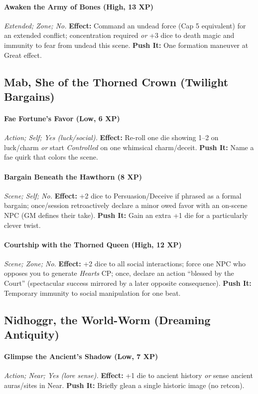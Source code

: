 \documentclass[12pt,twoside]{book}
\begin{document}
\paragraph{Awaken the Army of Bones (High, 13 XP)} \emph{Extended; Zone; No.}
\textbf{Effect:} Command an undead force (Cap 5 equivalent) for an extended conflict; concentration required \emph{or} +3 dice to death magic and immunity to fear from undead this scene.
\textbf{Push It:} One formation maneuver at Great effect.

\subsection{Mab, She of the Thorned Crown (Twilight Bargains)}
\paragraph{Fae Fortune’s Favor (Low, 6 XP)} \emph{Action; Self; Yes (luck/social).}
\textbf{Effect:} Re-roll one die showing 1–2 on luck/charm \emph{or} start \emph{Controlled} on one whimsical charm/deceit.
\textbf{Push It:} Name a fae quirk that colors the scene.
\paragraph{Bargain Beneath the Hawthorn (8 XP)} \emph{Scene; Self; No.}
\textbf{Effect:} +2 dice to Persuasion/Deceive if phrased as a formal bargain; once/session retroactively declare a minor owed favor with an on-scene NPC (GM defines their take).
\textbf{Push It:} Gain an extra +1 die for a particularly clever twist.
\paragraph{Courtship with the Thorned Queen (High, 12 XP)} \emph{Scene; Zone; No.}
\textbf{Effect:} +2 dice to all social interactions; force one NPC who opposes you to generate \emph{Hearts} CP; once, declare an action ``blessed by the Court'' (spectacular success mirrored by a later opposite consequence).
\textbf{Push It:} Temporary immunity to social manipulation for one beat.

\subsection{Nidhoggr, the World-Worm (Dreaming Antiquity)}
\paragraph{Glimpse the Ancient’s Shadow (Low, 7 XP)} \emph{Action; Near; Yes (lore sense).}
\textbf{Effect:} +1 die to ancient history \emph{or} sense ancient auras/sites in Near.
\textbf{Push It:} Briefly glean a single historic image (no retcon).
\end{document}
